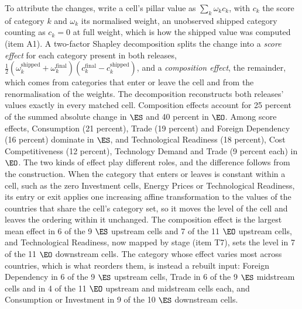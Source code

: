 To attribute the changes, write a cell's pillar value as $\sum_k \omega_k c_k$, with $c_k$ the
score of category $k$ and $\omega_k$ its normalised weight, an unobserved shipped category
counting as $c_k=0$ at full weight, which is how the shipped value was computed (item A1). A
two-factor Shapley decomposition splits the change into a \emph{score effect} for each category
present in both releases,
$\tfrac12(\omega_k^{\text{shipped}}+\omega_k^{\text{final}})(c_k^{\text{final}}-c_k^{\text{shipped}})$,
and a \emph{composition effect}, the remainder, which comes from categories that enter or leave
the cell and from the renormalisation of the weights. The decomposition reconstructs both
releases' values exactly in every matched cell. Composition effects account for 25 percent of the
summed absolute change in $\ES$ and 40 percent in $\EO$. Among score effects, Consumption (21
percent), Trade (19 percent) and Foreign Dependency (16 percent) dominate in $\ES$, and
Technological Readiness (18 percent), Cost Competitiveness (12 percent), Technology Demand and
Trade (9 percent each) in $\EO$. The two kinds of effect play different roles, and the difference
follows from the construction. When the category that enters or leaves is constant within a
cell, such as the zero Investment cells, Energy Prices or Technological Readiness, its entry or
exit applies one increasing affine transformation to the values of the countries that share the
cell's category set, so it moves the level of the cell and leaves the ordering within it
unchanged. The composition effect is the largest mean effect in 6 of the 9 $\ES$ upstream cells
and 7 of the 11 $\EO$ upstream cells, and Technological Readiness, now mapped by stage (item T7),
sets the level in 7 of the 11 $\EO$ downstream cells. The category whose effect varies most across
countries, which is what reorders them, is instead a rebuilt input: Foreign Dependency in 6 of the
9 $\ES$ upstream cells, Trade in 6 of the 9 $\ES$ midstream cells and in 4 of the 11 $\EO$
upstream and midstream cells each, and Consumption or Investment in 9 of the 10 $\ES$ downstream
cells.

